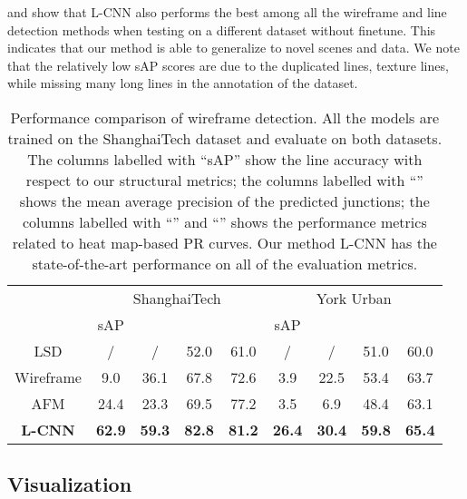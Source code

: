 \documentclass[10pt,twocolumn,letterpaper]{article}
\newcommand{\N}[1]{{\color{red}{#1}}}
\renewcommand{\N}[1]{{{#1}}}
\begin{document}
 and \N{ show that L-CNN also performs the best among all the wireframe and line detection methods when testing on a different dataset \cite{denis2008efficient} without finetune.  This indicates that our method is able to generalize to novel scenes and data.  We note that the relatively low sAP scores are due to the duplicated lines, texture lines, while missing many long lines in the annotation of the dataset.}




\begin{table}[t]
    \centering
    \footnotesize
    \setlength{\tabcolsep}{3pt}
    \renewcommand{\arraystretch}{1.2}
\begin{tabular}{c|cc|cc|cc|cc}
&\multicolumn{4}{c|}{ShanghaiTech \cite{Huang:2018:LPW}}&\multicolumn{4}{c}{York Urban \cite{denis2008efficient}} \\
 & sAP &  &  &  & sAP &  &  & \\ \hline
LSD  & / & / & 52.0 & 61.0             & / & / & 51.0 & 60.0 \\ \hline
Wireframe & 9.0 & 36.1 & 67.8 & 72.6   & 3.9 & 22.5 & 53.4 & 63.7 \\ \hline
AFM  & 24.4 & 23.3 & 69.5 & 77.2       & 3.5 & 6.9 & 48.4 & 63.1\\ \hline
\textbf{L-CNN} & \textbf{62.9} & \textbf{59.3} & \textbf{82.8} & \textbf{81.2} & \textbf{26.4} & \textbf{30.4} & \textbf{59.8} & \textbf{65.4}
\end{tabular}

    \caption{Performance comparison of wireframe detection.  All the models are trained on the ShanghaiTech dataset and evaluate on both datasets.  The columns labelled with ``sAP'' show the line accuracy with respect to our structural metrics; the columns labelled with ``'' shows the mean average precision of the predicted junctions; the columns labelled with ``'' and ``'' shows the performance metrics related to heat map-based PR curves.  Our method L-CNN has the state-of-the-art performance on all of the evaluation metrics.}
    \label{tab:result}
\end{table}

\subsection{Visualization} \label{sec:visualization}
\end{document}
